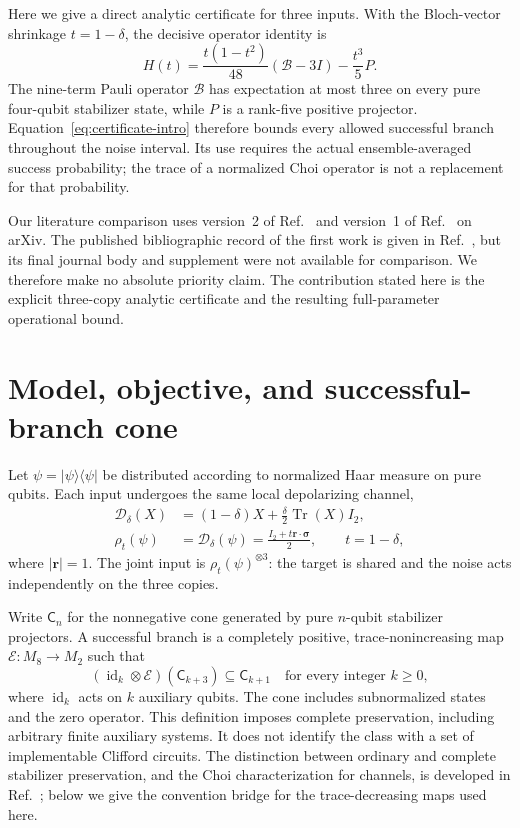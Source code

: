 \documentclass[aps,pra,reprint,amsmath,amssymb,longbibliography,nofootinbib]{revtex4-2}
\newcommand{\Tr}{\operatorname{Tr}}
\newcommand{\id}{\operatorname{id}}
\newcommand{\cE}{\mathcal E}
\newcommand{\cB}{\mathcal B}
\newcommand{\Cs}{\mathsf C}
\begin{document}
Here we give a direct analytic certificate for three inputs. With the Bloch-vector shrinkage $t=1-\delta$, the decisive operator identity is
\begin{equation}
 H(t)=\frac{t(1-t^2)}{48}(\cB-3I)-\frac{t^3}{5}P.
 \label{eq:certificate-intro}
\end{equation}
The nine-term Pauli operator $\cB$ has expectation at most three on every pure four-qubit stabilizer state, while $P$ is a rank-five positive projector. Equation~\eqref{eq:certificate-intro} therefore bounds every allowed successful branch throughout the noise interval. Its use requires the actual ensemble-averaged success probability; the trace of a normalized Choi operator is not a replacement for that probability.

Our literature comparison uses version~2 of Ref.~\cite{He2025NoGo} and version~1 of Ref.~\cite{He2026Resource} on arXiv. The published bibliographic record of the first work is given in Ref.~\cite{He2025NoGo}, but its final journal body and supplement were not available for comparison. We therefore make no absolute priority claim. The contribution stated here is the explicit three-copy analytic certificate and the resulting full-parameter operational bound.

\section{Model, objective, and successful-branch cone}
\label{sec:model}

Let $\psi=|\psi\rangle\langle\psi|$ be distributed according to normalized Haar measure on pure qubits. Each input undergoes the same local depolarizing channel,
\begin{align}
 \mathcal D_\delta(X)&=(1-\delta)X+\frac{\delta}{2}\Tr(X)I_2,
 \label{eq:noise}\\
 \rho_t(\psi)&=\mathcal D_\delta(\psi)
             =\frac{I_2+t\bm r\cdot\bm\sigma}{2},
 \qquad t=1-\delta,
 \label{eq:rho}
\end{align}
where $|\bm r|=1$. The joint input is $\rho_t(\psi)^{\otimes3}$: the target is shared and the noise acts independently on the three copies.

Write $\Cs_n$ for the nonnegative cone generated by pure $n$-qubit stabilizer projectors. A successful branch is a completely positive, trace-nonincreasing map $\cE:M_8\to M_2$ such that
\begin{equation}
  (\id_k\otimes\cE)(\Cs_{k+3})\subseteq\Cs_{k+1}
  \quad\text{for every integer }k\geq0,
  \label{eq:complete}
\end{equation}
where $\id_k$ acts on $k$ auxiliary qubits. The cone includes subnormalized states and the zero operator. This definition imposes complete preservation, including arbitrary finite auxiliary systems. It does not identify the class with a set of implementable Clifford circuits. The distinction between ordinary and complete stabilizer preservation, and the Choi characterization for channels, is developed in Ref.~\cite{Seddon2019}; below we give the convention bridge for the trace-decreasing maps used here.
\end{document}

